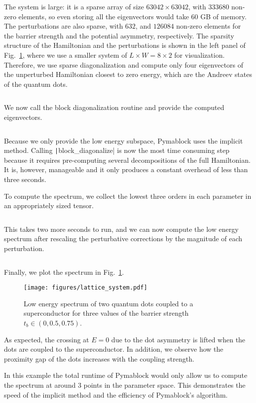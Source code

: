 The system is large: it is a sparse array of size $63042 \times 63042$, with $333680$ non-zero elements, so even storing all the eigenvectors would take $60$ GB of memory.
The perturbations are also sparse, with $632$, and $126084$ non-zero elements for the barrier strength and the potential asymmetry, respectively.
The sparsity structure of the Hamiltonian and the perturbations is shown in the left panel of Fig.~\ref{fig:QD_spectrum}, where we use a smaller system of $L \times W = 8 \times 2$ for visualization.
Therefore, we use sparse diagonalization and compute only four eigenvectors of the unperturbed Hamiltonian closest to zero energy, which are the Andreev states of the quantum dots.
%
\inputminted[firstline=62, lastline=63]{python}{code_figures/lattice_system.py}
%
We now call the block diagonalization routine and provide the computed eigenvectors.
%
\inputminted[firstline=65, lastline=65]{python}{code_figures/lattice_system.py}
%
Because we only provide the low energy subspace, Pymablock uses the implicit method.
Calling \texttt|block_diagonalize| is now the most time consuming step because it requires pre-computing several decompositions of the full Hamiltonian.
It is, however, manageable and it only produces a constant overhead of less than three seconds.

To compute the spectrum, we collect the lowest three orders in each parameter in an appropriately sized tensor.
%
\inputminted[firstline=71, lastline=71]{python}{code_figures/lattice_system.py}
%
This takes two more seconds to run, and we can now compute the low energy spectrum after rescaling the perturbative corrections by the magnitude of each perturbation.
%
\inputminted[firstline=74, lastline=79]{python}{code_figures/lattice_system.py}
%
Finally, we plot the spectrum in Fig.~\ref{fig:QD_spectrum}.
%
\begin{figure}[h!]
\centering
\texttt{[image: figures/lattice\_system.pdf]}
\caption{
    Low energy spectrum of two quantum dots coupled to a superconductor for three values of the barrier strength $t_b \in (0, 0.5, 0.75)$.
}
\label{fig:QD_spectrum}
\end{figure}
%
As expected, the crossing at $E=0$ due to the dot asymmetry is lifted when the dots are coupled to the superconductor.
In addition, we observe how the proximity gap of the dots increases with the coupling strength.

In this example the total runtime of Pymablock would only allow us to compute the spectrum at around $3$ points in the parameter space.
This demonstrates the speed of the implicit method and the efficiency of Pymablock's algorithm.
